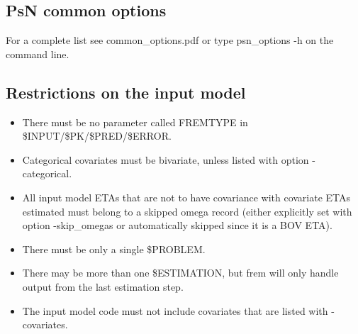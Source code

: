 \subsection{PsN common options}
For a complete list see common\_options.pdf or type psn\_options -h on the command line.

\subsection{Restrictions on the input model}
\begin{itemize}
	\item There must be no parameter called FREMTYPE in \$INPUT/\$PK/\$PRED/\$ERROR.
	\item Categorical covariates must be bivariate, unless listed with option -categorical.
    \item All input model ETAs that are not to have covariance with covariate ETAs estimated must
    belong to a skipped omega record (either explicitly set with option -skip\_omegas or
    automatically skipped since it is a BOV ETA).
    \item There must be only a single \$PROBLEM.
    \item There may be more than one \$ESTIMATION, but frem will only handle output from the last estimation step.
    \item The input model code must not include covariates that are listed with
    -covariates.
\end{itemize}

